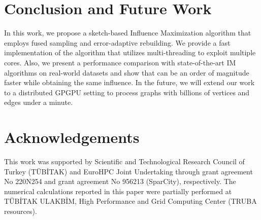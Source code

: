 \documentclass[review]{elsarticle}
\newcommand\acro{{\sc{HyperFuseR\xspace}\xspace}\xspace}
\newcommand\maxspeedupIMM{{{27.87\xspace}\xspace}\xspace}
\newcommand\maxspeedupSKIM{{{11\xspace}\xspace}\xspace}
\begin{document}
\section{Conclusion and Future Work}\label{sec:conclusion}

In this work, we propose a sketch-based Influence Maximization algorithm that employs fused sampling and error-adaptive rebuilding. We provide a fast implementation of the algorithm that utilizes multi-threading to exploit multiple cores. Also, we present a performance comparison with state-of-the-art IM algorithms on real-world datasets and show that \acro{} can be an order of magnitude faster while obtaining the same influence. 
In the future, we will extend our work to a distributed GPGPU setting to process graphs with billions of vertices and edges under a minute. 



\section*{Acknowledgements}

This work was supported by Scientific and Technological Research Council of Turkey (TÜBİTAK) and EuroHPC Joint Undertaking through grant agreement No 220N254 and grant agreement No 956213 (SparCity), respectively. The numerical calculations reported in this paper were partially performed at T{\"{U}}B\.{I}TAK ULAKB\.{I}M, High Performance and Grid Computing Center (TRUBA resources).

\end{document}
